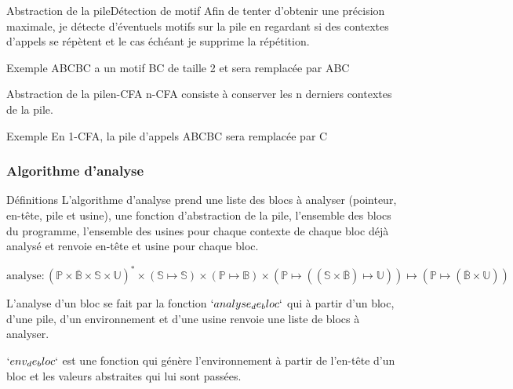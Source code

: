 \documentclass{beamer}
\begin{document}
\begin{frame}{Abstraction de la pile}{Détection de motif}
    Afin de tenter d'obtenir une précision maximale, je détecte d'éventuels motifs sur la pile en regardant si des contextes d'appels se répètent et le cas échéant je supprime la répétition.%

    \begin{exampleblock}{Exemple}
        ABCBC a un motif BC de taille 2 et sera remplacée par ABC
    \end{exampleblock}
\end{frame}

\begin{frame}{Abstraction de la pile}{n-CFA}
    n-CFA consiste à conserver les n derniers contextes de la pile.%

    \begin{exampleblock}{Exemple}
        En 1-CFA, la pile d'appels ABCBC sera remplacée par C
    \end{exampleblock}
\end{frame}



\subsubsection{Algorithme d'analyse}

\begin{frame}{Définitions}
    L'algorithme d'analyse prend une liste des blocs à analyser (pointeur, en-tête, pile et usine), une fonction d'abstraction de la pile, l'ensemble des blocs du programme, l'ensemble des usines pour chaque contexte de chaque bloc déjà analysé et renvoie en-tête et usine pour chaque bloc.

    $\text{analyse} : (\mathbb{P} \times \overline{\mathbb{B}} \times \mathbb{S} \times \mathbb{U})^{*} \times (\mathbb{S} \mapsto \mathbb{S}) \times (\mathbb{P} \mapsto \mathbb{B}) \times (\mathbb{P} \mapsto ((\mathbb{S} \times \overline{\mathbb{B}}) \mapsto \mathbb{U})) \mapsto (\mathbb{P} \mapsto (\overline{\mathbb{B}} \times \mathbb{U}))$

    L'analyse d'un bloc se fait par la fonction $`analyse_de_bloc`$ qui à partir d'un bloc, d'une pile, d'un environnement et d'une usine renvoie une liste de blocs à analyser.

    $`env_de_bloc`$ est une fonction qui génère l'environnement à partir de l'en-tête d'un bloc et les valeurs abstraites qui lui sont passées.
\end{frame}
\end{document}
